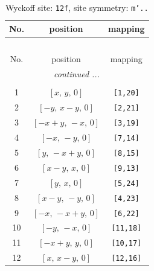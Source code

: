 \documentclass[fleqn,8pt]{jsarticle}
\begin{document}
\begin{longtable}{ccc}
\caption{Wyckoff site: {\tt 12f}, site symmetry: {\tt m'..}}
 \\
 \hline \hline
No. & position & mapping \\ \hline \endfirsthead

\multicolumn{2}{l}{\tablename\ \thetable{}} \\
 \hline \hline
No. & position & mapping \\ \hline \endhead

 \hline \hline
\multicolumn{2}{r}{\footnotesize\it continued ...} \\ \endfoot

 \hline \hline
\multicolumn{2}{r}{} \\ \endlastfoot

1 & $\left[ x,\, y,\, 0 \right]$ & {\tt [1,20]} \\ \hline
2 & $\left[ - y,\, x - y,\, 0 \right]$ & {\tt [2,21]} \\ \hline
3 & $\left[ - x + y,\, - x,\, 0 \right]$ & {\tt [3,19]} \\ \hline
4 & $\left[ - x,\, - y,\, 0 \right]$ & {\tt [7,14]} \\ \hline
5 & $\left[ y,\, - x + y,\, 0 \right]$ & {\tt [8,15]} \\ \hline
6 & $\left[ x - y,\, x,\, 0 \right]$ & {\tt [9,13]} \\ \hline
7 & $\left[ y,\, x,\, 0 \right]$ & {\tt [5,24]} \\ \hline
8 & $\left[ x - y,\, - y,\, 0 \right]$ & {\tt [4,23]} \\ \hline
9 & $\left[ - x,\, - x + y,\, 0 \right]$ & {\tt [6,22]} \\ \hline
10 & $\left[ - y,\, - x,\, 0 \right]$ & {\tt [11,18]} \\ \hline
11 & $\left[ - x + y,\, y,\, 0 \right]$ & {\tt [10,17]} \\ \hline
12 & $\left[ x,\, x - y,\, 0 \right]$ & {\tt [12,16]} \\
\end{longtable}
\renewcommand{\arraystretch}{1.2}
\end{document}
